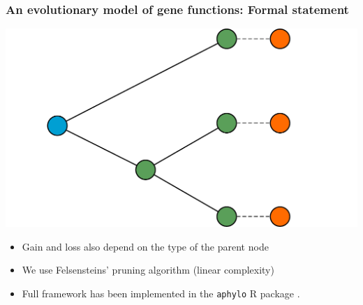 \documentclass[aspectratio=169, 10pt]{beamer}\usepackage[]{graphicx}\usepackage[]{color}
\newcommand{\aphylopkg}[0]{\texttt{aphylo}}
\begin{document}
\begin{frame}[label=aphylographicalviewcont]
\frametitle{An evolutionary model of gene functions: Formal statement}

\includegraphics[width=.5\linewidth]{aphylo.pdf}

\begin{itemize}[<+->]
\item Gain and loss also depend on the type of the parent node
\hyperlink{duplicationvsspeciation}{}

\item We use Felsensteins' pruning algorithm \hyperlink{aphyloalgorithmicview}{} (linear complexity)

\item Full framework has been implemented in the \aphylopkg{} R package \hyperlink{aphylopkg}{}.
\end{itemize}

\end{frame}
\end{document}
